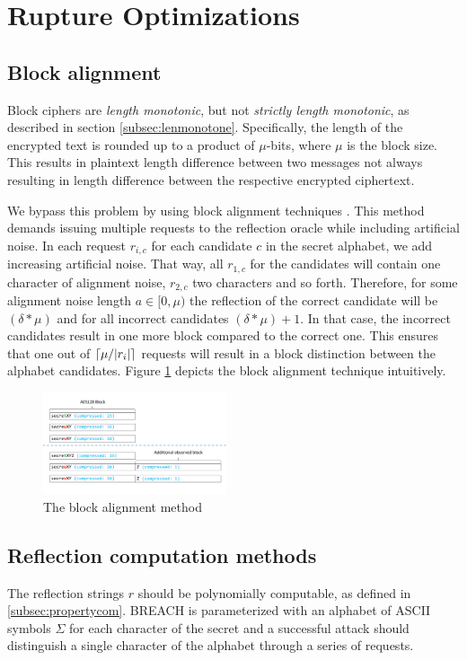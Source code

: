 \section{Rupture Optimizations}\label{subsec:optimizations}

\subsection{Block alignment}\label{subsec:blockalign}
Block ciphers are \textit{length monotonic}, but not \textit{strictly length
monotonic}, as described in section \ref{subsec:lenmonotone}. Specifically, the
length of the encrypted text is rounded up to a product of $\mu$-bits, where
$\mu$ is the block size. This results in plaintext length difference between two
messages not always resulting in length difference between the respective
encrypted ciphertext.

We bypass this problem by using block alignment techniques
\cite{moller2014poodle}. This method demands issuing multiple requests to the
reflection oracle while including artificial noise.  In each request $r_{i, c}$
for each candidate $c$ in the secret alphabet, we add increasing artificial
noise. That way, all $r_{1, c}$ for the candidates will contain one
character of alignment noise, $r_{2, c}$ two characters and so forth.
Therefore, for some alignment noise length $a \in [0, \mu)$ the reflection
of the correct candidate will be $(\delta*\mu)$ and for all incorrect
candidates $(\delta*\mu)+1$. In that case, the incorrect candidates result
in one more block compared to the correct one. This ensures that one out of
$\lceil\mu / |r_i|\rceil$ requests will result in a block distinction between the
alphabet candidates. Figure \ref{fig:block_alignment} depicts the block
alignment technique intuitively.

   \begin{figure}[thpb]
      \centering
          \includegraphics[width=0.48\textwidth]{figures/block_alignment.png}
      \caption{The block alignment method}
      \label{fig:block_alignment}
   \end{figure}

\subsection{Reflection computation methods}\label{subsec:reflectionmethods}
The reflection strings $r$ should be polynomially computable, as defined in
\ref{subsec:propertycom}. BREACH is parameterized with an alphabet of ASCII
symbols $\Sigma$ for each character of the secret and a successful attack should
distinguish a single character of the alphabet through a series of requests.


